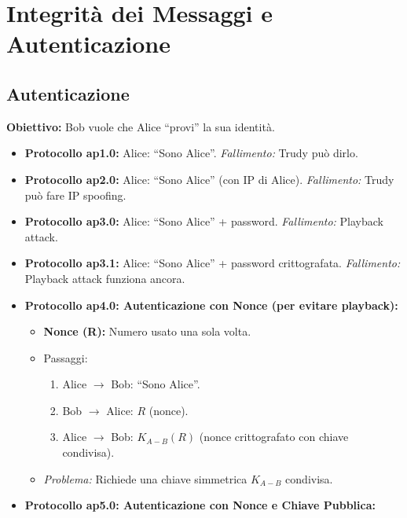 \section{Integrità dei Messaggi e Autenticazione}
\label{sec:integrita_autenticazione}

\subsection{Autenticazione}
\textbf{Obiettivo:} Bob vuole che Alice \textquotedblleft provi\textquotedblright{} la sua identità.

\begin{itemize}
    \item \textbf{Protocollo ap1.0:} Alice: \textquotedblleft Sono Alice\textquotedblright{}. \textit{Fallimento:} Trudy può dirlo.
    \item \textbf{Protocollo ap2.0:} Alice: \textquotedblleft Sono Alice\textquotedblright{} (con IP di Alice). \textit{Fallimento:} Trudy può fare IP spoofing.
    \item \textbf{Protocollo ap3.0:} Alice: \textquotedblleft Sono Alice\textquotedblright{} + password. \textit{Fallimento:} Playback attack.
    \item \textbf{Protocollo ap3.1:} Alice: \textquotedblleft Sono Alice\textquotedblright{} + password crittografata. \textit{Fallimento:} Playback attack funziona ancora.
    \item \textbf{Protocollo ap4.0: Autenticazione con Nonce (per evitare playback):}
    \begin{itemize}
        \item \textbf{Nonce (R):} Numero usato una sola volta.
        \item Passaggi:
        \begin{enumerate}
            \item Alice $\rightarrow$ Bob: \textquotedblleft Sono Alice\textquotedblright{}.
            \item Bob $\rightarrow$ Alice: $R$ (nonce).
            \item Alice $\rightarrow$ Bob: $K_{A-B}(R)$ (nonce crittografato con chiave condivisa).
        \end{enumerate}
        \item \textit{Problema:} Richiede una chiave simmetrica $K_{A-B}$ condivisa.
    \end{itemize}
    \item \textbf{Protocollo ap5.0: Autenticazione con Nonce e Chiave Pubblica:}
    \begin{enumerate}

\end{enumerate}
\end{itemize}
